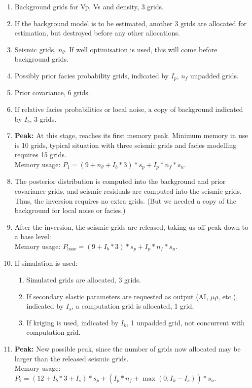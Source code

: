 \begin{enumerate}
\item Background grids for Vp, Vs and density, 3 grids.
\item If the background model is to be estimated, another 3 grids are
  allocated for estimation, but destroyed before any other
  allocations.
\item Seismic grids, $n_\theta$. If well optimisation is used, this
  will come before background grids.
\item Possibly prior facies probability grids, indicated by $I_p$,
  $n_f$ unpadded grids.
\item Prior covariance, 6 grids.
\item If relative facies probabilities or local noise, a copy of
  background indicated by $I_b$, 3 grids.
\item {\bf Peak:} At this stage, \crava reaches its first memory
  peak. Minimum memory in use is 10 grids, typical situation with
  three seismic grids and facies modelling requires 15 grids.\\
    Memory usage: $P_1 = (9+n_\theta+I_b*3)*s_p+I_p*n_f*s_u$.
\item The posterior distribution is computed into the background and
  prior covariance grids, and seismic residuals are computed into the
  seismic grids. Thus, the inversion requires no extra grids. (But we
  needed a copy of the background for local noise or facies.)
\item After the inversion, the seismic grids are released, taking us
  off peak down to a base level: \\
  Memory usage:  $P_\text{base} = (9+I_b*3)*s_p+I_p*n_f*s_u$.
\item If simulation is used:
\begin{enumerate}
\item Simulated grids are allocated, 3 grids.
\item If secondary elastic parameters are requested as output (AI,
  $\mu\rho$, etc.), indicated by $I_s$, a computation grid is
  allocated, 1 grid.
\item If kriging is used, indicated by $I_k$, 1 unpadded grid, not
  concurrent with computation grid.
\end{enumerate}
\item {\bf Peak:} New possible peak, since the number of grids now
  allocated may be larger than the released seismic grids. \\
    Memory usage: $P_2 = (12+I_b*3+I_s)*s_p + (I_p*n_f + \max(0,I_k-I_s))*s_u$.

\end{enumerate}
